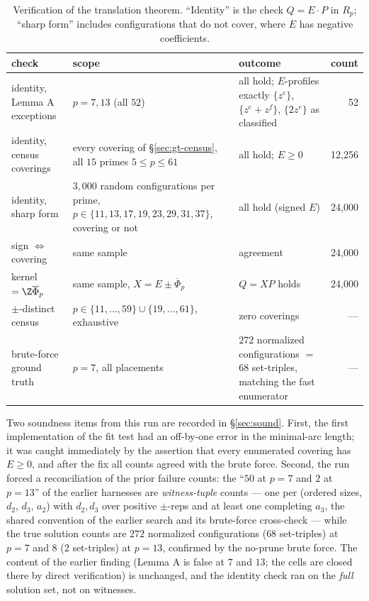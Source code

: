 \begin{table}[t]
\centering
\small
\caption{Verification of the translation theorem. ``Identity'' is the check
$Q=E\cdot P$ in $R_p$; ``sharp form'' includes configurations that do not
cover, where $E$ has negative coefficients.}
\label{tab:gtverify}
\begin{tabularx}{\textwidth}{@{}lXXr@{}}
\toprule
check & scope & outcome & count \\
\midrule
identity, Lemma A exceptions & $p=7,13$ (all $52$) & all hold; $E$-profiles
exactly $\{z^e\}$, $\{z^e{+}z^f\}$, $\{2z^e\}$ as classified & 52 \\
identity, census coverings & every covering of \S\ref{sec:gt-census}, all
$15$ primes $5\le p\le 61$ & all hold; $E\ge 0$ & 12{,}256 \\
identity, sharp form & $3{,}000$ random configurations per prime, $p\in\{11,
13,17,19,23,29,31,37\}$, covering or not & all hold (signed $E$) & 24{,}000 \\
sign $\Leftrightarrow$ covering & same sample & agreement & 24{,}000 \\
kernel $=\Z\overline\Phi_p$ & same sample, $X=E\pm\overline\Phi_p$ &
$Q=XP$ holds & 24{,}000 \\
$\pm$-distinct census & $p\in\{11,\dots,59\}\cup\{19,\dots,61\}$, exhaustive
& zero coverings & --- \\
brute-force ground truth & $p=7$, all placements & $272$ normalized
configurations $=$ $68$ set-triples, matching the fast enumerator & --- \\
\bottomrule
\end{tabularx}
\end{table}

Two soundness items from this run are recorded in \S\ref{sec:sound}. First,
the first implementation of the fit test had an off-by-one error in the
minimal-arc length; it was caught immediately by the assertion that every
enumerated covering has $E\ge 0$, and after the fix all counts agreed with
the brute force. Second, the run forced a reconciliation of the prior
failure counts: the ``$50$ at $p=7$ and $2$ at $p=13$'' of the earlier
harnesses are \emph{witness-tuple} counts --- one per (ordered sizes,
$d_2$, $d_3$, $a_2$) with $d_2,d_3$ over positive $\pm$-reps and at least
one completing $a_3$, the shared convention of the earlier search and its
brute-force cross-check --- while the true solution counts are $272$
normalized configurations ($68$ set-triples) at $p=7$ and $8$
($2$ set-triples) at $p=13$, confirmed by the no-prune brute force. The
content of the earlier finding (Lemma A is false at $7$ and $13$; the cells
are closed there by direct verification) is unchanged, and the identity
check ran on the \emph{full} solution set, not on witnesses.

